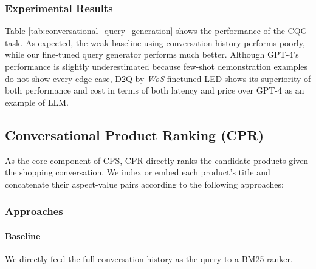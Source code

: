 \subsubsection{Experimental Results}
Table \ref{tab:conversational_query_generation} shows the performance of the CQG task.
As expected, the weak baseline using conversation history performs poorly, while our fine-tuned query generator performs much better. %
Although GPT-4's performance is slightly underestimated because few-shot demonstration examples do not show every edge case, D2Q by \textit{WoS}-finetuned LED shows its superiority of both performance and cost in terms of both latency and price over GPT-4 as an example of LLM.

\subsection{Conversational Product Ranking (CPR)}
As the core component of CPS, CPR directly ranks the candidate products given the shopping conversation. We index or embed each product's title and concatenate their aspect-value pairs according to the following approaches:

\subsubsection{Approaches}%

\paragraph{Baseline} %
We directly feed the full conversation history as the query to a BM25 ranker.

